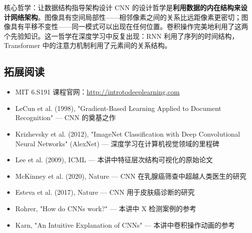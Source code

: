 \documentclass[a4paper]{article}
\begin{document}
\begin{importantbox}{核心哲学：让数据结构指导架构设计}
CNN 的设计哲学是\textbf{利用数据的内在结构来设计网络架构}。图像具有空间局部性——相邻像素之间的关系比远距像素更密切；图像具有平移不变性——同一模式可以出现在任何位置。卷积操作完美地利用了这两个先验知识。这一哲学在深度学习中反复出现：RNN 利用了序列的时间结构，Transformer 中的注意力机制利用了元素间的关系结构。
\end{importantbox}

\subsection{拓展阅读}

\begin{itemize}
    \item MIT 6.S191 课程官网：\url{http://introtodeeplearning.com}
    \item LeCun et al. (1998), "Gradient-Based Learning Applied to Document Recognition" — CNN 的奠基之作
    \item Krizhevsky et al. (2012), "ImageNet Classification with Deep Convolutional Neural Networks" (AlexNet) — 深度学习在计算机视觉领域的里程碑
    \item Lee et al. (2009), ICML — 本讲中特征层次结构可视化的原始论文
    \item McKinney et al. (2020), Nature — CNN 在乳腺癌筛查中超越人类医生的研究
    \item Esteva et al. (2017), Nature — CNN 用于皮肤癌诊断的研究
    \item Rohrer, "How do CNNs work?" — 本讲中 X 检测案例的参考
    \item Karn, "An Intuitive Explanation of CNNs" — 本讲中卷积操作动画的参考
\end{itemize}

\end{document}
